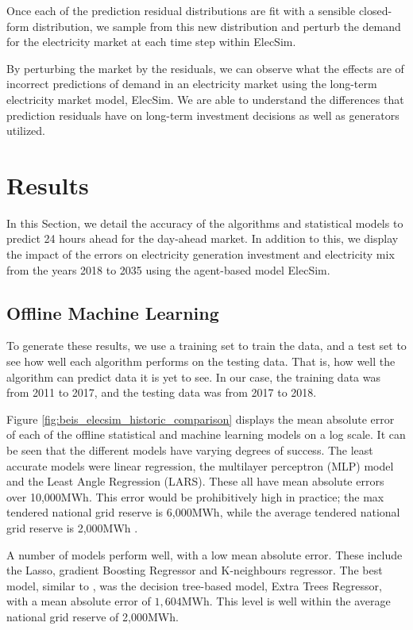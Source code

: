 Once each of the prediction residual distributions are fit with a sensible closed-form distribution, we sample from this new distribution and perturb the demand for the electricity market at each time step within ElecSim.

By perturbing the market by the residuals, we can observe what the effects are of incorrect predictions of demand in an electricity market using the long-term electricity market model, ElecSim. We are able to understand the differences that prediction residuals have on long-term investment decisions as well as generators utilized.




\section{Results}
\label{sec:results}

In this Section, we detail the accuracy of the algorithms and statistical models to predict 24 hours ahead for the day-ahead market. In addition to this, we display the impact of the errors on electricity generation investment and electricity mix from the years 2018 to 2035 using the agent-based model ElecSim.



\subsection{Offline Machine Learning}

To generate these results, we use a training set to train the data, and a test set to see how well each algorithm performs on the testing data. That is, how well the algorithm can predict data it is yet to see. In our case, the training data was from 2011 to 2017, and the testing data was from 2017 to 2018.

Figure \ref{fig:beis_elecsim_historic_comparison} displays the mean absolute error of each of the offline statistical and machine learning models on a log scale. It can be seen that the different models have varying degrees of success. The least accurate models were linear regression, the multilayer perceptron (MLP) model and the Least Angle Regression (LARS). These all have mean absolute errors over 10,000MWh. This error would be prohibitively high in practice; the max tendered national grid reserve is 6,000MWh, while the average tendered national grid reserve is 2,000MWh \cite{ESO2019}.

A number of models perform well, with a low mean absolute error. These include the Lasso, gradient Boosting Regressor and K-neighbours regressor. The best model, similar to \cite{Kell2018a}, was the decision tree-based model, Extra Trees Regressor, with a mean absolute error of $1,604$MWh. This level is well within the average national grid reserve of 2,000MWh.



